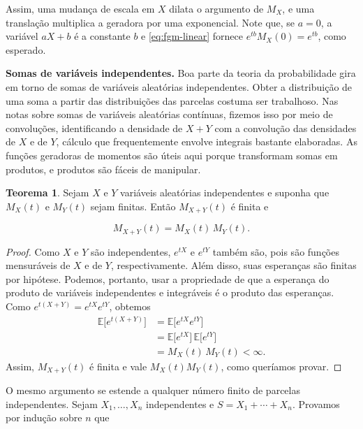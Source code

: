 \documentclass[12pt,portuguese]{article}
\theoremstyle{definition}
\newtheorem{theorem}{Teorema}
\theoremstyle{plainexercise}
\theoremstyle{starredexercise}
\theoremstyle{definition}
\begin{document}
Assim, uma mudança de escala em $X$ dilata o argumento de $M_X$, e uma
translação multiplica a geradora por uma exponencial. Note que, se $a=0$, a
variável $aX+b$ é a constante $b$ e \eqref{eq:fgm-linear} fornece
$e^{tb}M_X(0)=e^{tb}$, como esperado.

\medskip
\noindent\textbf{Somas de variáveis independentes.}
Boa parte da teoria da probabilidade gira em torno de somas de variáveis
aleatórias independentes. Obter a distribuição de uma soma a partir das distribuições das
parcelas costuma ser trabalhoso. Nas notas sobre somas de variáveis aleatórias
contínuas, fizemos isso por meio de convoluções, identificando a densidade de $X+Y$ com
a convolução das densidades de $X$ e de $Y$, cálculo que frequentemente envolve
integrais bastante elaboradas. As funções geradoras de momentos são úteis aqui
porque transformam somas em produtos, e produtos são fáceis de manipular.

\begin{theorem}\label{thm:fgm-soma}
Sejam $X$ e $Y$ variáveis aleatórias independentes e suponha que $M_X(t)$ e
$M_Y(t)$ sejam finitas. Então $M_{X+Y}(t)$ é finita e

\begin{equation}\label{eq:fgm-produto}
M_{X+Y}(t) = M_X(t)\,M_Y(t).
\end{equation}
\end{theorem}

\begin{proof}
Como $X$ e $Y$ são independentes, $e^{tX}$ e $e^{tY}$ também são,
pois são funções mensuráveis de $X$ e de $Y$, respectivamente.
Além disso, suas esperanças são finitas por hipótese. Podemos, portanto,
usar a propriedade de que a esperança do produto de variáveis
independentes e integráveis é o produto das esperanças. Como
$e^{t(X+Y)}=e^{tX}e^{tY}$, obtemos
\begin{align*}
\mathbb{E}\bigl[e^{t(X+Y)}\bigr]
&=\mathbb{E}\bigl[e^{tX}e^{tY}\bigr]
\\[0.3cm]
&=\mathbb{E}\bigl[e^{tX}\bigr]\,\mathbb{E}\bigl[e^{tY}\bigr]
\\[0.3cm]
&=M_X(t)\,M_Y(t)<\infty.
\end{align*}
Assim, $M_{X+Y}(t)$ é finita e vale $M_X(t)M_Y(t)$, como queríamos provar.
\end{proof}

O mesmo argumento se estende a qualquer número finito de parcelas
independentes. Sejam $X_1,\dots,X_n$ independentes e $S=X_1+\cdots+X_n$.
Provamos por indução sobre $n$ que
\end{document}
